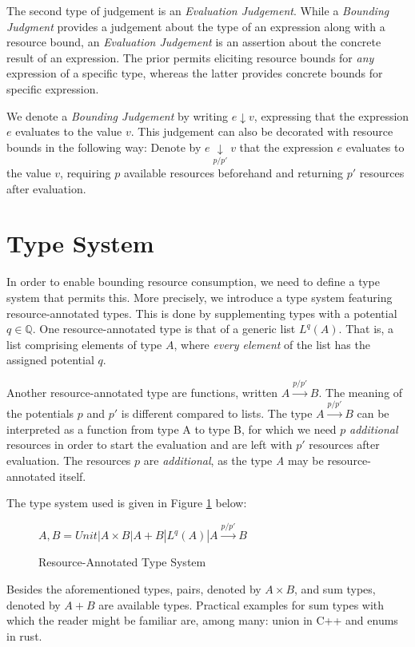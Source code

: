  The second type of judgement is an \emph{Evaluation Judgement}. While a \emph{Bounding Judgment} provides a judgement about the type of an expression along with a resource bound, an \emph{Evaluation Judgement} is an assertion about the concrete result of an expression. The prior permits eliciting resource bounds for \emph{any} expression of a specific type, whereas the latter provides concrete bounds for specific expression. 

 We denote a \emph{Bounding Judgement} by writing \(e \downarrow v\), expressing that the expression \(e\) evaluates to the value \(v\). This judgement can also be decorated with resource bounds in the following way: Denote by \(e \underset{p/p'}{\downarrow} v\) that the expression \(e\) evaluates to the value \(v\), requiring \(p\) available resources beforehand and returning \(p'\) resources after evaluation.


\section{Type System} \label{chap:type-system}
In order to enable bounding resource consumption, we need to define a type system that permits this. More precisely, we introduce a type system featuring resource-annotated types. This is done by supplementing types with a potential \(q \in \mathbb{Q}\). 
One resource-annotated type is that of a generic list \(L^q(A)\). That is, a list comprising elements of type \(A\), where \emph{every element} of the list has the assigned potential \(q\).

Another resource-annotated type are functions, written \(A \xrightarrow{p/p'} B\). The meaning of the potentials \(p\) and \(p'\) is different compared to lists. The type \(A \xrightarrow{p/p'} B\) can be interpreted as a function from type A to type B, for which we need \(p\) \emph{additional} resources in order to start the evaluation and are left with \(p'\) resources after evaluation. The resources \(p\) are \emph{additional}, as the type \emph{A} may be resource-annotated itself.

The type system used is given in Figure \ref{fig:type-system} below:

\begin{figure}[H]
\centering
\(A,B = Unit | A \times B | A + B | L^q(A) | A \xrightarrow{p/p'} B\)
\caption{Resource-Annotated Type System}
\label{fig:type-system}
\end{figure}

Besides the aforementioned types, pairs, denoted by \(A \times B\), and sum types, denoted by \(A + B\) are available types. Practical examples for sum types with which the reader might be familiar are, among many: union in C++ and enums in rust. 

